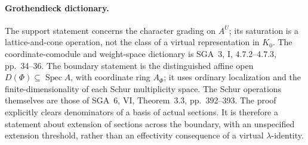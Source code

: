 \paragraph{Grothendieck dictionary.}
The support statement concerns the character grading on
\(A^U\); its saturation is a lattice-and-cone operation,
not the class of a virtual representation in \(K_0\).
The coordinate-comodule and weight-space dictionary is
SGA~3, I, 4.7.2--4.7.3, pp.~34--36.
The boundary statement is the distinguished affine open
\(D(\Phi)\subseteq\operatorname{Spec}A\), with coordinate
ring \(A_\Phi\); it uses ordinary localization and the
finite-dimensionality of each Schur multiplicity space.
The Schur operations themselves are those of SGA~6, VI,
Theorem~3.3, pp.~392--393. The proof explicitly clears
denominators of a basis of actual sections. It is therefore
a statement about extension of sections across the boundary,
with an unspecified extension threshold, rather than an
effectivity consequence of a virtual \(\lambda\)-identity.
